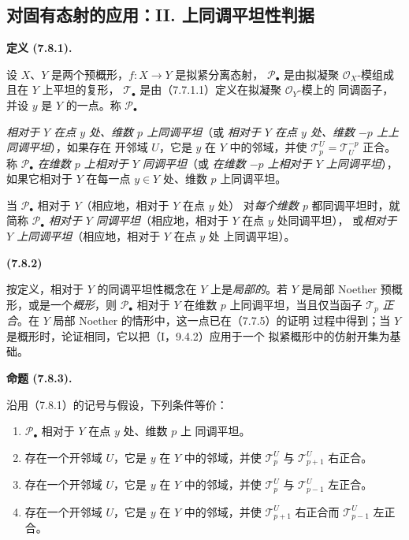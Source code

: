 \documentclass[UTF8,fontset=none,11pt,oneside,openany]{ctexbook}
\newenvironment{env}[1][]{%
  \par\medskip\noindent\textbf{(#1)}\ %
}{\par}
\newenvironment{definition}[1][]{%
  \par\medskip\noindent\textbf{定义 (#1).}\ %
}{\par}
\newenvironment{proposition}[1][]{%
  \par\medskip\noindent\textbf{命题 (#1).}\ %
}{\par}
\newcommand{\oldpage}[2][]{%
  \hypertarget{ega-source-page-#1-#2}{}%
  \marginnote{\scriptsize\textbf{#1}~|~#2}\ignorespaces}
\let\EGAOriginalLabel\label
\renewcommand{\label}[1]{\phantomsection\EGAOriginalLabel{#1}}
\begin{document}
\subsection{对固有态射的应用：II. 上同调平坦性判据}
\label{subsection:III.7.8.fr}

\begin{definition}[7.8.1]
设 $X$、$Y$ 是两个预概形，$f:X\to Y$ 是拟紧分离态射，
$\mathscr P_\bullet$ 是由拟凝聚 $\mathscr O_X$-模组成且在 $Y$ 上平坦的复形，
$\mathscr T_\bullet$ 是由（7.7.1.1）定义在拟凝聚 $\mathscr O_Y$-模上的
同调函子，并设 $y$ 是 $Y$ 的一点。称 $\mathscr P_\bullet$

\oldpage[III]{205}
\emph{相对于 $Y$ 在点 $y$ 处、维数 $p$ 上同调平坦}（或
\emph{相对于 $Y$ 在点 $y$ 处、维数 $-p$ 上上同调平坦}），如果存在
开邻域 $U$，它是 $y$ 在 $Y$ 中的邻域，并使
$\mathscr T_p^U=\mathscr T_U^{-p}$ 正合。称 $\mathscr P_\bullet$
\emph{在维数 $p$ 上相对于 $Y$ 同调平坦}（或
\emph{在维数 $-p$ 上相对于 $Y$ 上同调平坦}），如果它相对于 $Y$
在每一点 $y\in Y$ 处、维数 $p$ 上同调平坦。

当 $\mathscr P_\bullet$ 相对于 $Y$（相应地，相对于 $Y$ 在点 $y$ 处）
对\emph{每个维数 $p$} 都同调平坦时，就简称 $\mathscr P_\bullet$
\emph{相对于 $Y$ 同调平坦}（相应地，相对于 $Y$ 在点 $y$ 处同调平坦），
或\emph{相对于 $Y$ 上同调平坦}（相应地，相对于 $Y$ 在点 $y$ 处
上同调平坦）。
\end{definition}

\begin{env}[7.8.2]
按定义，相对于 $Y$ 的同调平坦性概念在 $Y$ 上是\emph{局部的}。若 $Y$
是局部 Noether 预概形，或是一个\emph{概形}，则 $\mathscr P_\bullet$
相对于 $Y$ 在维数 $p$ 上同调平坦，当且仅当函子 $\mathscr T_p$
\emph{正合}。在 $Y$ 局部 Noether 的情形中，这一点已在（7.7.5）的证明
过程中得到；当 $Y$ 是概形时，论证相同，它以把（I，9.4.2）应用于一个
拟紧概形中的仿射开集为基础。
\end{env}

\begin{proposition}[7.8.3]
沿用（7.8.1）的记号与假设，下列条件等价：
\begin{enumerate}
  \item[a)] $\mathscr P_\bullet$ 相对于 $Y$ 在点 $y$ 处、维数 $p$ 上
    同调平坦。
  \item[b)] 存在一个开邻域 $U$，它是 $y$ 在 $Y$ 中的邻域，并使
    $\mathscr T_p^U$ 与 $\mathscr T_{p+1}^U$ 右正合。
  \item[c)] 存在一个开邻域 $U$，它是 $y$ 在 $Y$ 中的邻域，并使
    $\mathscr T_p^U$ 与 $\mathscr T_{p-1}^U$ 左正合。
  \item[d)] 存在一个开邻域 $U$，它是 $y$ 在 $Y$ 中的邻域，并使
    $\mathscr T_{p+1}^U$ 右正合而 $\mathscr T_{p-1}^U$ 左正合。
\end{enumerate}
\end{proposition}
\end{document}
